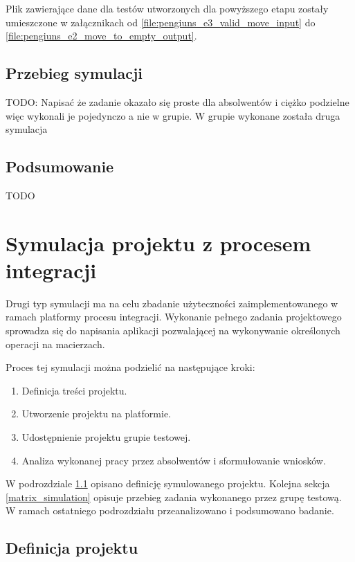 Plik zawierające dane dla testów utworzonych dla powyższego etapu zostały umieszczone w załącznikach od \ref{file:pengiuns_e3_valid_move_input} do \ref{file:pengiuns_e2_move_to_empty_output}.


\subsection{Przebieg symulacji}
\label{penguins_simulation}

TODO: Napisać że zadanie okazało się proste dla absolwentów i ciężko podzielne więc wykonali je pojedynczo a nie w grupie.
W grupie wykonane została druga symulacja


\subsection{Podsumowanie}

TODO


\section{Symulacja projektu z procesem integracji}
\label{research_matrix}

Drugi typ symulacji ma na celu zbadanie użyteczności zaimplementowanego w ramach platformy procesu integracji.
Wykonanie pełnego zadania projektowego sprowadza się do napisania aplikacji pozwalającej na wykonywanie określonych operacji na macierzach.

Proces tej symulacji można podzielić na następujące kroki:
\begin{enumerate}
    \item Definicja treści projektu.
    \item Utworzenie projektu na platformie.
    \item Udostępnienie projektu grupie testowej.
    \item Analiza wykonanej pracy przez absolwentów i sformułowanie wniosków.
\end{enumerate}

W podrozdziale \ref{matrix_project_definition} opisano definicję symulowanego projektu.
Kolejna sekcja \ref{matrix_simulation} opisuje przebieg zadania wykonanego przez grupę testową.
W ramach ostatniego podrozdziału przeanalizowano i podsumowano badanie.


\subsection{Definicja projektu}
\label{matrix_project_definition}

